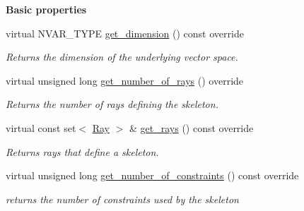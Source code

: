 \begin{Indent}\textbf{ Basic properties}\par
\begin{DoxyCompactItemize}
\item 
\mbox{\label{group___c_l_s_solvers_af6e6f37b09b2e4b1f45581c8a772f3eb}} 
virtual N\+V\+A\+R\+\_\+\+T\+Y\+PE \hyperlink{group___c_l_s_solvers_af6e6f37b09b2e4b1f45581c8a772f3eb}{get\+\_\+dimension} () const override
\begin{DoxyCompactList}\small\item\em Returns the dimension of the underlying vector space. \end{DoxyCompactList}\item 
\mbox{\label{group___c_l_s_solvers_a4ee0b95d41c3861267176f5b249837e8}} 
virtual unsigned long \hyperlink{group___c_l_s_solvers_a4ee0b95d41c3861267176f5b249837e8}{get\+\_\+number\+\_\+of\+\_\+rays} () override
\begin{DoxyCompactList}\small\item\em Returns the number of rays defining the skeleton. \end{DoxyCompactList}\item 
virtual const set$<$ \hyperlink{group___c_l_s_solvers_class_l_p___solvers_1_1_ray}{Ray} $>$ \& \hyperlink{group___c_l_s_solvers_a9ded7ec7a82decb93132e10e25851528}{get\+\_\+rays} () const override
\begin{DoxyCompactList}\small\item\em Returns rays that define a skeleton. \end{DoxyCompactList}\item 
virtual unsigned long \hyperlink{group___c_l_s_solvers_af28eb491140e583b453773ead208ae32}{get\+\_\+number\+\_\+of\+\_\+constraints} () const override
\begin{DoxyCompactList}\small\item\em returns the number of constraints used by the skeleton \end{DoxyCompactList}\end{DoxyCompactItemize}
\end{Indent}
